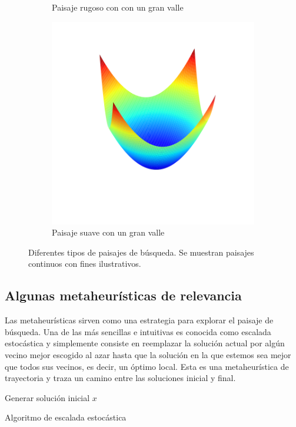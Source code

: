 \begin{figure}[H]
\begin{subfigure}{.5\textwidth}
    \caption{Paisaje rugoso con con un gran valle}
\end{subfigure}
\begin{subfigure}{\textwidth}
    \centering
    \includegraphics[scale=.4]{Imagenes/smoothvalley.png}
    \caption{Paisaje suave con un gran valle}
\end{subfigure}
\caption{Diferentes tipos de paisajes de búsqueda. Se muestran paisajes continuos con fines ilustrativos.}
    \label{fig:landtypes}
\end{figure}

\subsection*{Algunas metaheurísticas de relevancia}
Las metaheurísticas sirven como una estrategia para explorar el paisaje de búsqueda. Una de las más sencillas e intuitivas es conocida como escalada estocástica y simplemente consiste en reemplazar la solución actual por algún vecino mejor escogido al azar hasta que la solución en la que estemos sea mejor que todos sus vecinos, es decir, un óptimo local. Esta es una metaheurística de trayectoria y traza un camino entre las soluciones inicial y final.\\

%
\begin{algorithm}[H]
 Generar solución inicial $x$\;
    \label{alg:LS}
    \caption{Algoritmo de escalada estocástica}
\end{algorithm}

